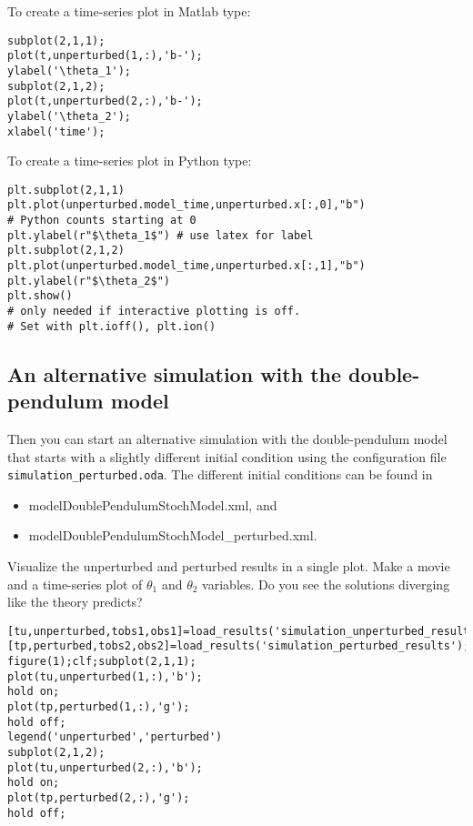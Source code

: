\ifshowmatlab
To create a time-series plot in Matlab type:
\begin{lstlisting}[style=MatlabStyle,frame=single,caption={Matlab}]
subplot(2,1,1);
plot(t,unperturbed(1,:),'b-');
ylabel('\theta_1');
subplot(2,1,2);
plot(t,unperturbed(2,:),'b-');
ylabel('\theta_2');
xlabel('time');
\end{lstlisting}
\fi
      
To create a time-series plot in Python type:
\begin{lstlisting}[style=PythonStyle,caption={Python}]
plt.subplot(2,1,1)
plt.plot(unperturbed.model_time,unperturbed.x[:,0],"b") 
# Python counts starting at 0
plt.ylabel(r"$\theta_1$") # use latex for label
plt.subplot(2,1,2)
plt.plot(unperturbed.model_time,unperturbed.x[:,1],"b")
plt.ylabel(r"$\theta_2$")
plt.show() 
# only needed if interactive plotting is off. 
# Set with plt.ioff(), plt.ion()
\end{lstlisting}
%
\subsection{An alternative simulation with the double-pendulum model}

Then you can start an alternative simulation with the double-pendulum model that
starts with a slightly different initial condition using the
configuration file \texttt{ simulation\_perturbed.oda}. The different initial conditions
can be found in 
\begin{itemize}
 \item {\ttfamily model\/DoublePendulumStochModel.xml}, and 
 \item {\ttfamily model\/DoublePendulumStochModel\_perturbed.xml}.
\end{itemize}

Visualize the unperturbed and perturbed results in a single plot. Make
       a movie and a time-series plot of $\theta_1$ and $\theta_2$ variables. Do you see
       the solutions diverging like the theory predicts?
       
\ifshowmatlab
\begin{lstlisting}[style=MatlabStyle, caption={Matlab}]
[tu,unperturbed,tobs1,obs1]=load_results('simulation_unperturbed_results');
[tp,perturbed,tobs2,obs2]=load_results('simulation_perturbed_results');
figure(1);clf;subplot(2,1,1);
plot(tu,unperturbed(1,:),'b');
hold on;
plot(tp,perturbed(1,:),'g');
hold off;
legend('unperturbed','perturbed')
subplot(2,1,2);
plot(tu,unperturbed(2,:),'b');
hold on;
plot(tp,perturbed(2,:),'g');
hold off;\end{lstlisting}
\fi
      
